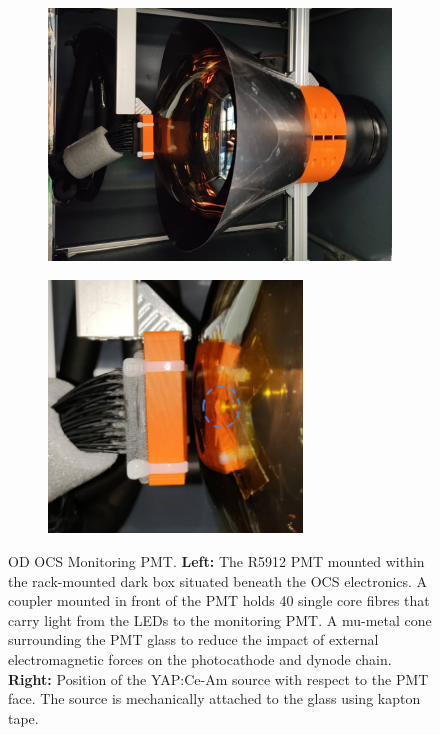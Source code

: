 \begin{figure}[ht!]
     \centering
     \begin{subfigure}[b]{0.47\textwidth}
         \centering
         \includegraphics[width=\textwidth]{figures/ODCommissioning/MonitoringPMT.png}
     \end{subfigure}
     \hfill
     \begin{subfigure}[b]{0.47\textwidth}
         \centering
         \includegraphics[width=0.74\textwidth]{figures/ODCommissioning/YAPCeSource.png}
     \end{subfigure}
        \caption[Photographs of the OD OCS Monitoring PMT.]{OD OCS Monitoring PMT. \textbf{Left:} The R5912 PMT mounted within the rack-mounted dark box situated beneath the OCS electronics. A coupler mounted in front of the PMT holds 40 single core fibres that carry light from the LEDs to the monitoring PMT. A mu-metal cone surrounding the PMT glass to reduce the impact of external electromagnetic forces on the photocathode and dynode chain. \textbf{Right: }Position of the YAP:Ce-Am source with respect to the PMT face. The source is mechanically attached to the glass using kapton tape.}
        \label{fig:ODCommissioning/MonPMT_YAPCeSource}
\end{figure}

